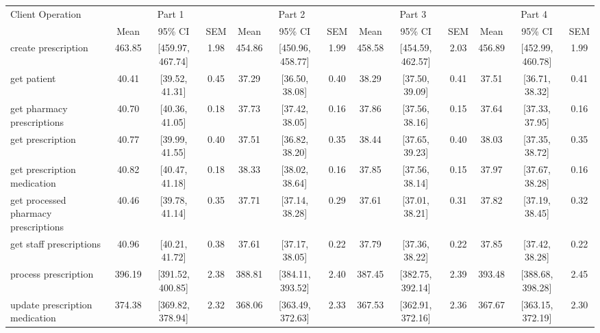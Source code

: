 \begin{tabular}{l|ccc|ccc|ccc|ccc}
\hline
Client Operation & \multicolumn{3}{c}{Part 1} & \multicolumn{3}{c}{Part 2} & \multicolumn{3}{c}{Part 3} & \multicolumn{3}{c}{Part 4} \\
  & Mean & 95\% CI & SEM & Mean & 95\% CI & SEM & Mean & 95\% CI & SEM & Mean & 95\% CI & SEM \\
\hline
 create prescription & 463.85 & [459.97, 467.74] & 1.98 & 454.86 & [450.96, 458.77] & 1.99 & 458.58 & [454.59, 462.57] & 2.03 & 456.89 & [452.99, 460.78] & 1.99 \\
 get patient & 40.41 & [39.52, 41.31] & 0.45 & 37.29 & [36.50, 38.08] & 0.40 & 38.29 & [37.50, 39.09] & 0.41 & 37.51 & [36.71, 38.32] & 0.41 \\
 get pharmacy prescriptions & 40.70 & [40.36, 41.05] & 0.18 & 37.73 & [37.42, 38.05] & 0.16 & 37.86 & [37.56, 38.16] & 0.15 & 37.64 & [37.33, 37.95] & 0.16 \\
 get prescription & 40.77 & [39.99, 41.55] & 0.40 & 37.51 & [36.82, 38.20] & 0.35 & 38.44 & [37.65, 39.23] & 0.40 & 38.03 & [37.35, 38.72] & 0.35 \\
 get prescription medication & 40.82 & [40.47, 41.18] & 0.18 & 38.33 & [38.02, 38.64] & 0.16 & 37.85 & [37.56, 38.14] & 0.15 & 37.97 & [37.67, 38.28] & 0.16 \\
 get processed pharmacy prescriptions & 40.46 & [39.78, 41.14] & 0.35 & 37.71 & [37.14, 38.28] & 0.29 & 37.61 & [37.01, 38.21] & 0.31 & 37.82 & [37.19, 38.45] & 0.32 \\
 get staff prescriptions & 40.96 & [40.21, 41.72] & 0.38 & 37.61 & [37.17, 38.05] & 0.22 & 37.79 & [37.36, 38.22] & 0.22 & 37.85 & [37.42, 38.28] & 0.22 \\
 process prescription & 396.19 & [391.52, 400.85] & 2.38 & 388.81 & [384.11, 393.52] & 2.40 & 387.45 & [382.75, 392.14] & 2.39 & 393.48 & [388.68, 398.28] & 2.45 \\
 update prescription medication & 374.38 & [369.82, 378.94] & 2.32 & 368.06 & [363.49, 372.63] & 2.33 & 367.53 & [362.91, 372.16] & 2.36 & 367.67 & [363.15, 372.19] & 2.30 \\
\hline
\end{tabular}